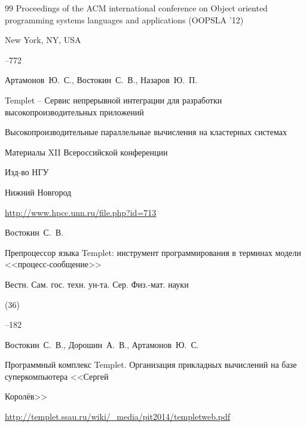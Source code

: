 \begin{thebibliography}{99}
\inbook  Proceedings of the ACM international conference on Object oriented programming systems languages and applications (OOPSLA '12)

\publaddr New York, NY, USA


--772








\by Артамонов~Ю.~С., Востокин~С.~В., Назаров~Ю.~П.

\paper Templet – Сервис непрерывной интеграции для разработки высокопроизводительных приложений

\inbook Высокопроизводительные параллельные вычисления на кластерных системах

\bookinfo Материалы XII Всероссийской конференции



\publ Изд-во НГУ

\publaddr Нижний Новгород

\elink \url{http://www.hpcc.unn.ru/file.php?id=713}






\by Востокин~С.~В.

\paper Препроцессор языка Templet: инструмент  программирования в терминах модели <<процесс-сообщение>>


\jour Вестн. Сам. гос. техн. ун-та. Сер. Физ.-мат. науки

(36)


--182






\by Востокин~С.~В., Дорошин~А.~В., Артамонов~Ю.~С.

\preprint Программный комплекс   Templet. Организация прикладных вычислений на базе суперкомпьютера <<Сергей

  Королёв>>



\elink \url{http://templet.ssau.ru/wiki/_media/pit2014/templetweb.pdf}







\end{thebibliography}





